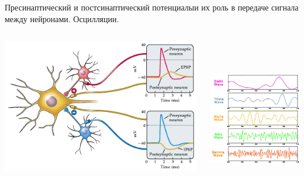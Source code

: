 \documentclass[12pt]{beamer}
\begin{document}
\begin{frame}[t]{\small Пресинаптический и постсинаптический потенциалы}{и их роль в передаче сигнала между нейронами. Осцилляции.}
\begin{columns}
    \begin{column}{0.5\textwidth}
        \includegraphics[scale=0.37]{neuronal_population.png}

    \end{column}

    \begin{column}{0.5\textwidth}
        \includegraphics[width=5cm, height=7cm]{waves.jpg}
    \end{column}


\end{columns}


\end{frame}
\end{document}
